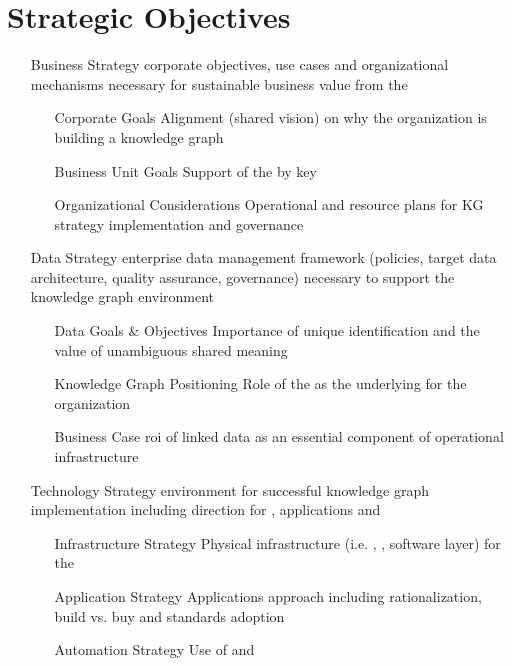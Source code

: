 \chapter{Strategic Objectives}
%
%
\begin{itemize}[leftmargin=2in,font=\bfseries]
  \item [Business Strategy] corporate objectives, use cases and organizational mechanisms necessary for sustainable business value from the 
  \begin{itemize}[labelwidth=1.5in,leftmargin=0in]
    \item [Corporate Goals] Alignment (shared vision) on why the organization is building a knowledge graph
    \item [Business Unit Goals] Support of the  by
          key  
    \item [Organizational Considerations] Operational and resource plans for KG strategy implementation and governance
  \end{itemize}
  \item [Data Strategy] enterprise data management framework (policies, target data architecture, quality assurance,
        governance) necessary to support the knowledge graph environment
    \begin{itemize}[labelwidth=1.5in,leftmargin=0in]
      \item [Data Goals \& Objectives] Importance of unique identification and the value of unambiguous shared meaning
      \item [Knowledge Graph Positioning] Role of the  as the underlying 
            for the organization
      \item [Business Case] \gls{roi} of linked data as an essential component of operational infrastructure
    \end{itemize}
  \item [Technology Strategy] environment for successful knowledge graph implementation including direction for
        , applications and 
    \begin{itemize}[labelwidth=1.5in,leftmargin=0in]
      \item [Infrastructure Strategy] Physical infrastructure (i.e. , ,
            software layer) for the 
      \item [Application Strategy] Applications approach including rationalization, build vs. buy and standards adoption
      \item [Automation Strategy] Use of  and 
    \end{itemize}
\end{itemize}

